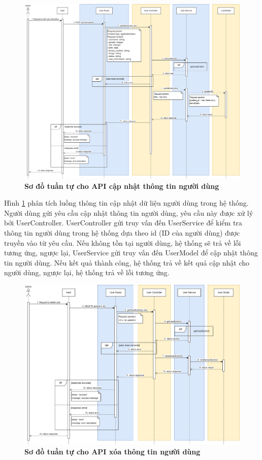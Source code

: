 \begin{figure}[H]
  \centering
  \includegraphics[scale=0.35]{Images/sequence_api/editUser.png}
  \caption[Sơ đồ tuần tự cho API cập nhật thông tin người dùng ]{\bfseries \fontsize{12pt}{0pt}
  \selectfont Sơ đồ tuần tự cho API cập nhật thông tin người dùng }
  \label{api_updateUserById} %
\end{figure}
Hình \ref{api_updateUserById} phân tích luồng thông tin cập nhật dữ liệu người dùng trong hệ thống. Người dùng gửi yêu cầu cập nhật thông tin người dùng, 
yêu cầu này được xử lý bởi UserController. UserController gửi truy vấn đến UserService để kiểm tra thông tin người dùng trong hệ thống dựa theo id (ID của người dùng) được truyền vào từ yêu cầu. 
Nếu không tồn tại người dùng, hệ thống sẽ trả về lỗi tương ứng, ngược lại, UserService gửi truy vấn đến UserModel để cập nhật thông tin người dùng. Nếu kết quả thành công, hệ thống trả về kết quả cập nhật cho người dùng, ngược lại, hệ thống trả về lỗi tương ứng.
\begin{figure}[H]
  \centering
  \includegraphics[scale=0.4]{Images/sequence_api/deleteUserById.png}
  \caption[Sơ đồ tuần tự cho API xóa thông tin người dùng ]{\bfseries \fontsize{12pt}{0pt}
  \selectfont Sơ đồ tuần tự cho API xóa thông tin người dùng }
  \label{api_deleteUser} %
\end{figure}
